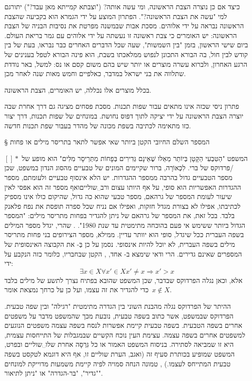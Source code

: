 כיצד אם כן נוצרה הצבת הראשונה, ומי עשה אותה? ("וצבתא קמייתא מאן עבד?") יתורגם
למי "עשה את הצבת הראשונה?". הפתרון המוצע על ידי הגמרא הוא בקביעה שהצבת הראשונה
נבראה על ידי אלוהים. מסכת אבות שבמשנה מפרטת את נסיבות הבניה של הצבת הראשונה: יש
האומרים כי צבת ראשונה זו נעשתה על ידי אלוהים עם גמר בריאת העולם. ביום שישי
הראשון, בזמן "בין השמשות", שעה שכל הדברים האחרים כבר נבראו, בעת של בין קודש לבין
חול, בה הבורא התכונן לנפוש ממלאכתו בשבת, הוא פינה הבורא לטפל בענינים
של הרגע האחרון, ולברוא עשרה מוצרים או יותר שיש בהם משום קסם או נס: למשל, באר
נודדת שתלווה את בני ישראל במדבר, כאלפיים וחמש מאות שנה לאחר מכן.

בכלל מוצרים אלו נכללה, יש האומרים, הצבת הראשונה.

פתרון ניסי שכזה אינו מתאים עבור שפות תכנות. מסכת פסחים מציגה גם דרך אחרת
שבה יוצרה הצבת הראשונה על ידי יציקה לתוך דפוס נחושת. במונחים של שפות תכנות, דרך
יצור כזו מתאימה לכתיבה בשפת מכונה של מהדר בעבור שפת תכנות חדשה.

§ המספר השלם החיובי הקטן ביותר שאי אפשר לתאר בתריסר מילים או פחות

המשפט "הַטִּבְעִי הַקָּטָן בְּיוֹתֵר מֵאֵלּו שֶׁאֵינָם גְּדִירִים בְּפָחוֹת מִתְּרֵיסָר מִלִּים" הוא מופע של
{\([^{}]*\)}/פרדוקס של ברי. לִכְאוֹרָה, ברור שקיימים המונים של טבעיים מהסוג הנדון במשפט, שכן
מספר הטבעיים גדול בהרבה ממספר ההגדרות. יש הלא אינסוף טבעיים ולעומתם, מספר
ההגדרות האפשריות הוא סופי, על אף היותו עצום ורב␣שוליים{ואף מספר זה הוא
אפסי לאין שיעור לעומת המספר של גרהאם, מספר טבעי שהוא כה גדול, שהיקום כולו אינו
מספיק לכתיבתו, אפילו לא בצורת מגדל חזקות, ואפילו אם נניח שכל ספרה תופסת את נפח
פלאנק בלבד. בכל זאת, את המספר של גרהאם של ניתן להגדיר בפחות מתריסר מילים:
"המספר הגדול ביותר ששימש אי פעם בהוכחה מתימטית עד שנת 1980". }. שהרי, יגדל
מספר המילים בשפה העברית ככל שיגדל, סופי הוא יוותר עדיין. ממילא, מספר הצירופים
בני פחות מתריסר מילים בשפה העברית, לא יוכל להיות אינסופי.
נסמן על כן בְּ- את הקבוצה האינסופית של המספרים שאינם גדירים. הרי ודאי שימצא
ב- אחד, , הקטן שבחבריו, כלומר כזה  הנקבע על ידי: \[
 ∃
x∈X\mbox{}∀ x'∈X\mbox{}x'≠x\mbox{}⇒ x'>x
\] אלא, וכאן נגלה הפרדוקס שבדבר, שכן המשפט שהובא בפתיח נצרך לתשע של מילים בלבד
      כדי להגדיר את  זה עצמו, ועל כן על כרחך נמצאת אומר~$x∉ X$.

ההיתר של הפרדוקס נגלה מהבנת השוני בין הגדרה מתימטית "רגילה" ובין שפה טבעית.
הפרדוקס שבמשפט, אשר כתוב בשפה טבעית, נובעת מכך שהמשפט מדבר על משפטים אחרים בשפה
הטבעית. בשפה טבעית קיימת אפשרות לנסח בשפה עצמה משפטים הנוגעים למשפטים אחרים
בשפה עצמה. עצימת העין נוכח הקשיים שבמגבלות של התייחסות עצמית, היא זו שמביאה
לסתירה. בניסוח המשפט האמור או כל גִּרְסָה אחרת שלו␣שוליים{ ובפרט, המשפט
  שמופיע בכותרת סעיף זה (ואגב, הערת שוליים זו, אף היא דוגמא לטקסט בשפה טבעית
  המתייחס לעצמו.)
}, טמונה הנחה סמויה לפיה קיימת משמעות מדוייקת למונחים "גדיר", "בר-הגדרה" או "ניתן לתיאור".


